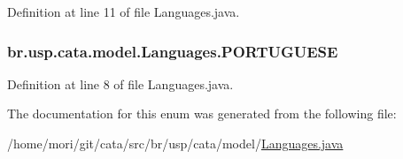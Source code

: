 Definition at line 11 of file Languages.\+java.

\hypertarget{enumbr_1_1usp_1_1cata_1_1model_1_1_languages_a836bacc47bbba846ef6a9e1885bc3e2c}{
\subsubsection[{P\+O\+R\+T\+U\+G\+U\+E\+S\+E}]{\setlength{\rightskip}{0pt plus 5cm}br.\+usp.\+cata.\+model.\+Languages.\+P\+O\+R\+T\+U\+G\+U\+E\+S\+E}}\label{enumbr_1_1usp_1_1cata_1_1model_1_1_languages_a836bacc47bbba846ef6a9e1885bc3e2c}


Definition at line 8 of file Languages.\+java.



The documentation for this enum was generated from the following file\+:\begin{DoxyCompactItemize}
\item 
/home/mori/git/cata/src/br/usp/cata/model/\hyperlink{_languages_8java}{Languages.\+java}\end{DoxyCompactItemize}
